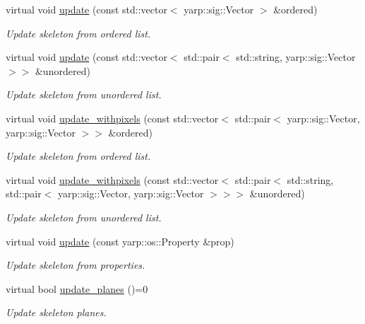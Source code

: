 \begin{DoxyCompactItemize}
virtual void \mbox{\hyperlink{classassistive__rehab_1_1Skeleton_adbb387558eac21173b7c82cb43acd603}{update}} (const std\+::vector$<$ yarp\+::sig\+::\+Vector $>$ \&ordered)
\begin{DoxyCompactList}\small\item\em Update skeleton from ordered list. \end{DoxyCompactList}\item 
virtual void \mbox{\hyperlink{classassistive__rehab_1_1Skeleton_ab9642d6621d0a2b189c020f4d7695b14}{update}} (const std\+::vector$<$ std\+::pair$<$ std\+::string, yarp\+::sig\+::\+Vector $>$$>$ \&unordered)
\begin{DoxyCompactList}\small\item\em Update skeleton from unordered list. \end{DoxyCompactList}\item 
virtual void \mbox{\hyperlink{classassistive__rehab_1_1Skeleton_a20d9eb5aecd6dccfa7e049bb932a6cef}{update\+\_\+withpixels}} (const std\+::vector$<$ std\+::pair$<$ yarp\+::sig\+::\+Vector, yarp\+::sig\+::\+Vector $>$$>$ \&ordered)
\begin{DoxyCompactList}\small\item\em Update skeleton from ordered list. \end{DoxyCompactList}\item 
virtual void \mbox{\hyperlink{classassistive__rehab_1_1Skeleton_a36e9dfd4910120025e40ccc3d03c0e01}{update\+\_\+withpixels}} (const std\+::vector$<$ std\+::pair$<$ std\+::string, std\+::pair$<$ yarp\+::sig\+::\+Vector, yarp\+::sig\+::\+Vector $>$$>$$>$ \&unordered)
\begin{DoxyCompactList}\small\item\em Update skeleton from unordered list. \end{DoxyCompactList}\item 
virtual void \mbox{\hyperlink{classassistive__rehab_1_1Skeleton_ae3346b2f363e1812fdc88e59d1f7bf7d}{update}} (const yarp\+::os\+::\+Property \&prop)
\begin{DoxyCompactList}\small\item\em Update skeleton from properties. \end{DoxyCompactList}\item 
virtual bool \mbox{\hyperlink{classassistive__rehab_1_1Skeleton_af0ee2be195f804a9562cb184a2be0bad}{update\+\_\+planes}} ()=0
\begin{DoxyCompactList}\small\item\em Update skeleton planes. \end{DoxyCompactList}\item 

\end{DoxyCompactItemize}
